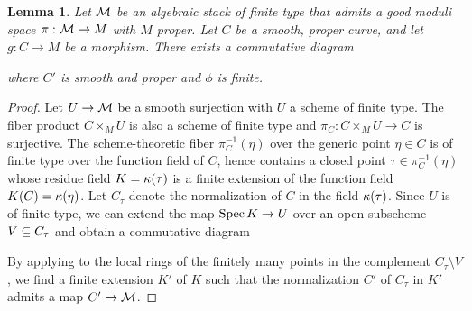 \documentclass[letterpaper,11pt]{amsart}%
\newtheorem{lem}[thm]{Lemma}
\theoremstyle{remark}
\begin{document}
\begin{lem}\label{finitecurveextension}
    Let $\mathcal{M}$ be an algebraic stack of finite type that admits a good moduli space $\pi: \mathcal{M} \to M$ with $M$ proper. Let $C$ be a smooth, proper curve, and let $g: C \to M$ be a morphism. There exists a commutative diagram
    \begin{center}
    \end{center}
    where $C'$ is smooth and proper and $\phi$ is finite.
\end{lem}
\begin{proof}
    Let $U \to \mathcal{M}$ be a smooth surjection with $U$ a scheme of finite type. The fiber product $C \times_M U$ is also a scheme of finite type and $\pi_C: C \times_M U \to C$ is surjective. The scheme-theoretic fiber $\pi_C^{-1}(\eta)$ over the generic point $\eta \in C$ is of finite type over the function field of $C$, hence contains a closed point $\tau \in \pi_C^{-1}(\eta)$ whose residue field $K = \kappa(\tau)$ is a finite extension of the function field $K(C) = \kappa(\eta)$. Let $C_\tau$ denote the normalization of $C$ in the field $\kappa(\tau)$. Since $U$ is of finite type, we can extend the map $\operatorname{\mathrm{Spec}} K \to U$ over an open subscheme $V \subseteq C_\tau$ and obtain a commutative diagram
    \begin{center}
    \end{center}
    By applying \cite[Theorem A.8]{AHLH} to the local rings of the finitely many points in the complement $C_\tau \setminus V$, we find a finite extension $K'$ of $K$ such that the normalization $C'$ of $C_\tau$ in $K'$ admits a map $C' \to \mathcal{M}$.
\end{proof}
\end{document}
